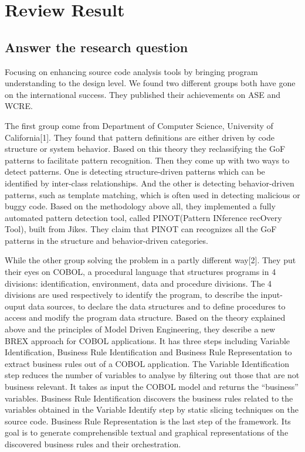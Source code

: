 \documentclass{article}
\begin{document}
\section{Review Result}



\subsection{Answer the research question}

Focusing on enhancing source code analysis tools by bringing program understanding to the design level. We found two different groups both have gone on the international success. They published their achievements on ASE and WCRE.

The first group come from Department of Computer Science, University of California[1]. They found that pattern definitions are either driven by code structure or system behavior. Based on this theory they reclassifying the GoF patterns to facilitate pattern recognition. Then they come up with two ways to detect patterns. One is detecting structure-driven patterns which can be identified by inter-class relationships. And the other is detecting behavior-driven patterns, such as template matching, which is often used in detecting malicious or buggy code. Based on the methodology above all, they implemented a fully automated pattern detection tool, called PINOT(Pattern INference recOvery Tool), built from Jikes. They claim that PINOT can recognizes all the GoF patterns in the structure and behavior-driven categories. 

While the other group solving the problem in a partly different way[2]. They put their eyes on COBOL, a procedural language that structures programs in 4 divisions: identification, environment, data and procedure divisions. The 4 divisions are used respectively to identify the program, to describe the input-ouput data sources, to declare the data structures and to define procedures to access and modify the program data structure. Based on the theory explained above and the principles of Model Driven Engineering, they describe a new BREX approach for COBOL applications. It has three steps including Variable Identification, Business Rule Identification and Business Rule Representation to extract business rules out of a COBOL application. The Variable Identification step reduces the number of variables to analyse by filtering out those that are not business relevant. It takes as input the COBOL model and returns the “business” variables. Business Rule Identification discovers the business rules related to the variables obtained in the Variable Identify step by static slicing techniques on the source code. Business Rule Representation is the last step of the framework. Its goal is to generate comprehensible textual and graphical representations of the discovered business rules and their orchestration.
\end{document}

